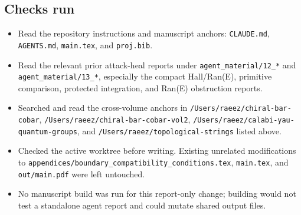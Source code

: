 \subsection{Checks run}

\begin{itemize}
\item Read the repository instructions and manuscript anchors:
\verb|CLAUDE.md|, \verb|AGENTS.md|, \verb|main.tex|, and \verb|proj.bib|.

\item Read the relevant prior attack-heal reports under
\verb|agent_material/12_*| and \verb|agent_material/13_*|, especially the
compact Hall/Ran(E), primitive comparison, protected integration, and
Ran(E) obstruction reports.

\item Searched and read the cross-volume anchors in
\verb|/Users/raeez/chiral-bar-cobar|,
\verb|/Users/raeez/chiral-bar-cobar-vol2|,
\verb|/Users/raeez/calabi-yau-quantum-groups|, and
\verb|/Users/raeez/topological-strings| listed above.

\item Checked the active worktree before writing.  Existing unrelated
modifications to \verb|appendices/boundary_compatibility_conditions.tex|,
\verb|main.tex|, and \verb|out/main.pdf| were left untouched.

\item No manuscript build was run for this report-only change; building
would not test a standalone agent report and could mutate shared output
files.
\end{itemize}
